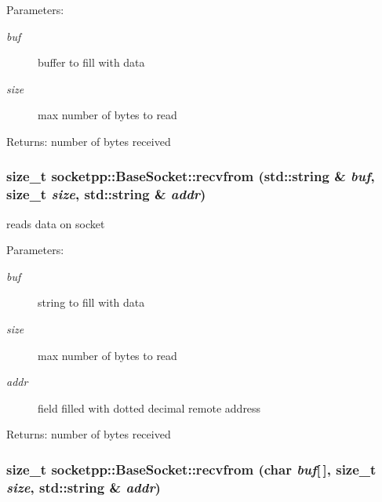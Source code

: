 \begin{Desc}
\item[Parameters:]
\begin{description}
\item[{\em buf}]buffer to fill with data \item[{\em size}]max number of bytes to read \end{description}
\end{Desc}
\begin{Desc}
\item[Returns:]number of bytes received \end{Desc}
\hypertarget{classsocketpp_1_1BaseSocket_ace82407e13a6eee26aa1f5f642d0cfc}{
\subsubsection[{recvfrom}]{\setlength{\rightskip}{0pt plus 5cm}size\_\-t socketpp::BaseSocket::recvfrom (std::string \& {\em buf}, \/  size\_\-t {\em size}, \/  std::string \& {\em addr})}}
\label{classsocketpp_1_1BaseSocket_ace82407e13a6eee26aa1f5f642d0cfc}


reads data on socket 

\begin{Desc}
\item[Parameters:]
\begin{description}
\item[{\em buf}]string to fill with data \item[{\em size}]max number of bytes to read \item[{\em addr}]field filled with dotted decimal remote address \end{description}
\end{Desc}
\begin{Desc}
\item[Returns:]number of bytes received \end{Desc}
\hypertarget{classsocketpp_1_1BaseSocket_c7a79cd90b082806dcafb14fbbd130b8}{
\subsubsection[{recvfrom}]{\setlength{\rightskip}{0pt plus 5cm}size\_\-t socketpp::BaseSocket::recvfrom (char {\em buf}\mbox{[}$\,$\mbox{]}, \/  size\_\-t {\em size}, \/  std::string \& {\em addr})}}
\label{classsocketpp_1_1BaseSocket_c7a79cd90b082806dcafb14fbbd130b8}


